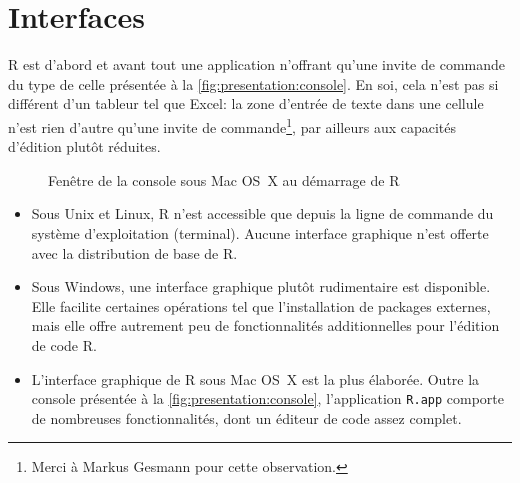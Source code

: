 \documentclass[11pt,article]{memoir}
\begin{document}
\section{Interfaces}
\label{presentation:interfaces}

R est d'abord et avant tout une application n'offrant qu'une invite de
commande du type de celle présentée à la
\autoref{fig:presentation:console}. En soi, cela n'est pas si
différent d'un tableur tel que Excel: la zone d'entrée de texte dans
une cellule n'est rien d'autre qu'une invite de commande\footnote{%
  Merci à Markus Gesmann pour cette observation.}, par ailleurs aux
capacités d'édition plutôt réduites.

\begin{figure}
  \centering
  \caption{Fenêtre de la console sous Mac OS~X au démarrage de R}
  \label{fig:presentation:console}
\end{figure}

\begin{itemize}
\item Sous Unix et Linux, R n'est accessible que depuis la ligne de
  commande du système d'exploitation (terminal). Aucune interface
  graphique n'est offerte avec la distribution de base de R.
\item Sous Windows, une interface graphique plutôt rudimentaire est
  disponible. Elle facilite certaines opérations tel que
  l'installation de packages externes, mais elle offre autrement peu
  de fonctionnalités additionnelles pour l'édition de code R.
\item L'interface graphique de R sous Mac OS~X est la plus élaborée.
  Outre la console présentée à la
  \autoref{fig:presentation:console}, l'application \texttt{R.app}
  comporte de nombreuses fonctionnalités, dont un éditeur de code
  assez complet.
\end{itemize}
\end{document}

